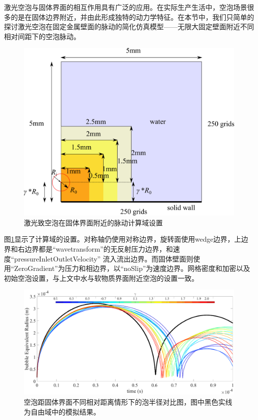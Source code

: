 激光空泡与固体界面的相互作用具有广泛的应用。在实际生产生活中，空泡场景很多的是在固体边界附近，并由此形成独特的动力学特征。在本节中，我们只简单的探讨激光空泡在固定金属壁面的脉动的简化仿真模型——无限大固定壁面附近不同相对间距下的空泡脉动。

\begin{figure}[h]
    \centering
    \includegraphics[width=0.7\linewidth]{img/solidwall.pdf}
    \caption{激光致空泡在固体界面附近的脉动计算域设置}
    \label{fig3.solidwallsetup}
\end{figure}

图\ref{fig3.solidwallsetup}显示了计算域的设置。对称轴仍使用对称边界，旋转面使用wedge边界，上边界和右边界都是“wavetransform”的无反射压力边界，和速度“pressureInletOutletVelocity” 流入流出边界。而固体壁面则使用“ZeroGradient”为压力和相边界，以“noSlip”为速度边界。网格密度和加密以及初始空泡设置，与上文中水与软物质界面附近空泡的设置一致。


\begin{figure}[h]
    \centering
    \includegraphics[width=1\linewidth]{img/fig3.solid.eps}
    \caption[空泡距固体界面不同相对距离情形下的泡半径对比图]{空泡距固体界面不同相对距离情形下的泡半径对比图，图中黑色实线为自由域中的模拟结果。}
    \label{fig3.solidradius}
\end{figure}

